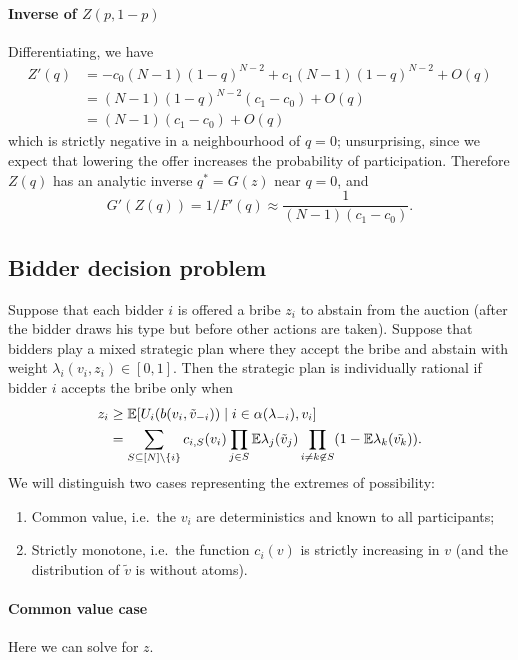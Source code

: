 \paragraph{Inverse of $Z(p,1-p)$}

Differentiating, we have
\begin{align*}
  Z'(q) &= -c_0(N-1)(1-q)^{N-2} + c_1(N-1)(1-q)^{N-2} + O(q) \\
  &= (N-1)(1-q)^{N-2}(c_1-c_0) + O(q) \\
  &= (N-1)(c_1-c_0) + O(q)
\end{align*}
which is strictly negative in a neighbourhood of $q=0$; unsurprising, since we expect that lowering the offer increases the probability of participation.
%
Therefore $Z(q)$ has an analytic inverse $q^*=G(z)$ near $q=0$, and 
\[
  G'(Z(q)) = 1/F'(q) \approx \frac{1}{(N-1)(c_1-c_0)}.
\]

\subsection{Bidder decision problem}

Suppose that each bidder $i$ is offered a bribe $z_i$ to abstain from the auction (after the bidder draws his type but before other actions are taken).
%
Suppose that bidders play a mixed strategic plan where they accept the bribe and abstain with weight $\lambda_i(v_i,z_i)\in[0,1]$.
%
Then the strategic plan is individually rational if bidder $i$ accepts the bribe only when
\begin{align*}
  z_i &\geq \mathbb{E}[U_i(b(v_i,\tilde{v}_{-i})) \mid i\in \alpha(\lambda_{-i}), v_i] \\
  &= \sum_{S\subseteq [N]\setminus\{i\}} c_{i,S}(v_i) \prod_{j\in S}\mathbb{E}\lambda_j(\tilde v_j) \prod_{i\neq k\not\in S} (1-\mathbb{E}\lambda_k(\tilde{v_k})).
\end{align*}
%
We will distinguish two cases representing the extremes of possibility:
\begin{enumerate}
  \item Common value, i.e.~the $v_i$ are deterministics and known to all participants;
  \item Strictly monotone, i.e.~the function $c_i(v)$ is strictly increasing in $v$ (and the distribution of $\tilde{v}$ is without atoms).
\end{enumerate}

\paragraph{Common value case}
Here we can solve for $z$.


